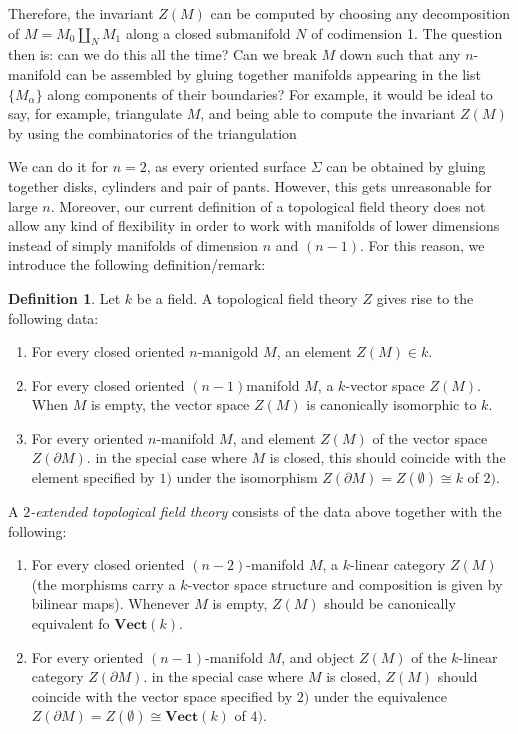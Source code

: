 \documentclass[a4paper,11pt]{article}
\newcommand{\vecto}{\mathbf{Vect}}
\theoremstyle{plain}
\theoremstyle{definition}
\newtheorem{defi}[thm]{Definition}
\theoremstyle{remark}
\begin{document}
Therefore, the invariant $Z(M)$ can be computed by choosing any decomposition of $M = M_0 \amalg_N M_1$ along a closed submanifold $N$ of codimension 1. The question then is: can we do this all the time? Can we break $M$ down such that any $n$-manifold can be assembled by gluing together manifolds appearing in the list $\{M_{\alpha}\}$ along components of their boundaries? For example, it would be ideal to say, for example, triangulate $M$, and being able to compute the invariant $Z(M)$ by using the combinatorics of the triangulation

We can do it for $n = 2$, as every oriented surface $\Sigma$ can be obtained by gluing together disks, cylinders and pair of pants. However, this gets unreasonable for large $n$. Moreover, our current definition of a topological field theory does not allow any kind of flexibility in order to work with manifolds of lower dimensions instead of simply manifolds of dimension $n$ and $(n-1)$. For this reason, we introduce the following definition/remark: 

\begin{defi}
\label{extended_tft}
Let $k$ be a field. A topological field theory $Z$ gives rise to the following data:

\begin{enumerate}[label = \arabic*)]
    \item For every closed oriented $n$-manigold $M$, an element $Z(M) \in k$. 
    \item For every closed oriented $(n-1)$manifold $M$, a $k$-vector space $Z(M)$. When $M$ is empty, the vector space $Z(M)$ is canonically isomorphic to $k$.
    \item For every oriented $n$-manifold $M$, and element $Z(M)$ of the vector space $Z(\partial M)$. in the special case where $M$ is closed, this should coincide with the element specified by $1)$ under the isomorphism $Z(\partial M) = Z(\emptyset) \cong k$ of $2)$.
\end{enumerate}
A \textit{$2$-extended topological field theory} consists of the data above together with the following: 
\begin{enumerate}[resume]
    \item For every closed oriented $(n-2)$-manifold $M$, a $k$-linear category $Z(M)$ (the morphisms carry a $k$-vector space structure and composition is given by bilinear maps). Whenever $M$ is empty, $Z(M)$ should be canonically equivalent fo $\textbf{Vect}(k)$. 
    \item For every oriented $(n-1)$-manifold $M$, and object $Z(M)$ of the $k$-linear category $Z(\partial M)$. in the special case where $M$ is closed, $Z(M)$ should coincide with the vector space specified by $2)$ under the equivalence $Z(\partial M) = Z(\emptyset) \cong \vecto(k)$ of $4)$.
\end{enumerate}
\end{defi}
\end{document}
